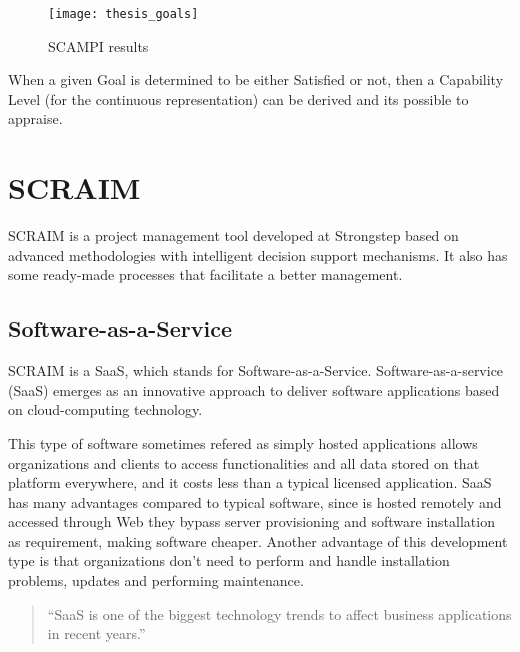  
\begin{figure}[h]
	\begin{center}
		\leavevmode
		\texttt{[image: thesis\_goals]}
		\caption{SCAMPI results}
		\label{fig:scampiresults}
	\end{center}
\end{figure}


When a given Goal is determined to be either Satisfied or not, then a Capability Level (for the continuous representation) can be derived and its possible to appraise.

\section{SCRAIM}

SCRAIM \citep{SCRAIM} is a project management tool developed at Strongstep based on advanced methodologies with intelligent decision support mechanisms. It also has some ready-made processes that facilitate a better management.

\subsection{Software-as-a-Service}

SCRAIM is a SaaS, which stands for Software-as-a-Service. Software-as-a-service (SaaS) emerges as an innovative
approach to deliver software applications based on cloud-computing
technology. \citep{Chou:2007:ANI:1359479.1359484}

This type of software sometimes refered as simply hosted applications allows organizations and clients to access functionalities and all data stored on that platform everywhere, and it costs less than a typical licensed application. SaaS has many advantages compared to typical software, since is hosted remotely and accessed through Web they bypass server provisioning and software
installation as requirement, making software cheaper. Another advantage of this development type is that organizations don't need to perform and handle installation problems, updates and performing maintenance.

\begin{quote}
	``SaaS is one of the biggest technology trends to affect business
	applications in recent years.''~\cite{House2009}
\end{quote}

